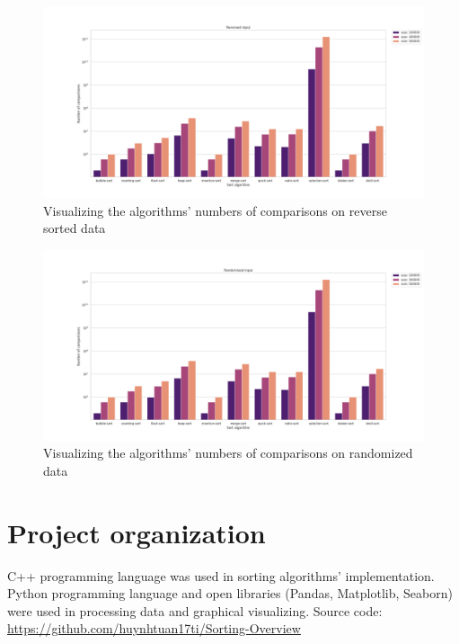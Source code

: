 \documentclass[11pt,a4paper]{article}
\begin{document}
\begin{figure}[H]
  \includegraphics[width = 16cm]{plot/rev_bar.png}
  \centering
  \caption{Visualizing the algorithms' numbers of comparisons on reverse sorted data}
\end{figure}

\begin{figure}[H]
  \includegraphics[width = 16cm]{plot/rand_bar.png}
  \centering
  \caption{Visualizing the algorithms' numbers of comparisons on randomized data}
\end{figure}

\section{Project organization}
C++ programming language was used in sorting algorithms' implementation.
Python programming language and open libraries (Pandas, Matplotlib, Seaborn) were used in processing data and graphical visualizing.
\newline
Source code: \url{https://github.com/huynhtuan17ti/Sorting-Overview}
\end{document}
